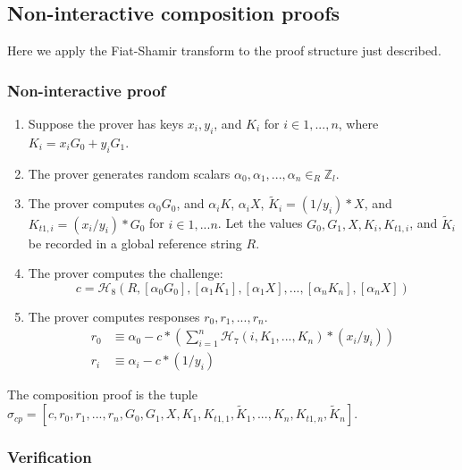 \begin{appendices}
\subsection{Non-interactive composition proofs}
\label{appendix:noninteractive-composition-proofs}

Here we apply the Fiat-Shamir transform \cite{fiat-shamir-transform} to the proof structure just described.

\subsubsection{Non-interactive proof}

\begin{enumerate}
    \item Suppose the prover has keys $x_i, y_i$, and $K_i$ for $i \in 1,...,n$, where $K_i = x_i G_0 + y_i G_1$.

    \item The prover generates random scalars $\alpha_0, \alpha_1, ..., \alpha_n \in_R \mathbb{Z}_l$.

    \item The prover computes $\alpha_0 G_0$, and $\alpha_i K$, $\alpha_i X$, $\tilde{K}_i = (1/y_i)*X$, and $K_{t1,i} = (x_i/y_i)*G_0$ for $i \in 1,...n$. Let the values $G_0, G_1, X, K_i, K_{t1,i}$, and $\tilde{K}_i$ be recorded in a global reference string $R$.

    \item The prover computes the challenge:
    \[c = \mathcal{H}_8(R, [\alpha_0 G_0], [\alpha_1 K_1], [\alpha_1 X],...,[\alpha_n K_n], [\alpha_n X])\]

    \item The prover computes responses $r_0, r_1, ..., r_n$.\vspace{.115cm}
    \begin{align*}
        r_0 &\equiv \alpha_0 - c*(\sum^n_{i=1} \mathcal{H}_7(i, K_1,...,K_n)*(x_i/y_i)) \\
        r_i &\equiv \alpha_i - c*(1/y_i)
    \end{align*}
\end{enumerate}

The composition proof is the tuple $\sigma_{cp} = [c, r_0, r_1, ..., r_n, G_0, G_1, X, K_1, K_{t1,1}, \tilde{K}_1, ..., K_n, K_{t1,n}, \tilde{K}_n]$.

\subsubsection{Verification}


\end{appendices}
